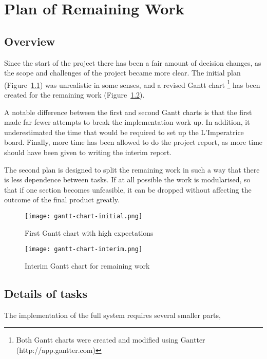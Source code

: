 \chapter{Plan of Remaining Work} %
\label{cha:plan_of_remaining_work}



\section{Overview} %
\label{sec:overview}
Since the start of the project there has been a fair amount of decision changes, as the scope and challenges of the project became more clear.  The initial plan (Figure~\ref{fig:gantt1}) was unrealistic in some senses, and a revised Gantt chart \footnote{Both Gantt charts were created and modified using Gantter (http://app.gantter.com)} has been created for the remaining work (Figure~\ref{fig:gantt2}). 

A notable difference between the first and second Gantt charts is that the first made far fewer attempts to break the implementation work up.  In addition, it underestimated the time that would be required to set up the L'Imperatrice board.  Finally, more time has been allowed to do the project report, as more time should have been given to writing the interim report.

The second plan is designed to split the remaining work in such a way that there is less dependence between tasks.  If at all possible the work is modularised, so that if one section becomes unfeasible, it can be dropped without affecting the outcome of the final product greatly.


\begin{figure}[tb]
	\begin{center}
		\texttt{[image: gantt-chart-initial.png]}
	\end{center}
	\caption{First Gantt chart with high expectations}
	\label{fig:gantt1}
\end{figure}

\begin{figure}[tb]
	\begin{center}
		\texttt{[image: gantt-chart-interim.png]}
	\end{center}
	\caption{Interim Gantt chart for remaining work}
	\label{fig:gantt2}
\end{figure}


\section{Details of tasks} %
\label{sec:details_of_tasks}
The implementation of the full system requires several smaller parts,


